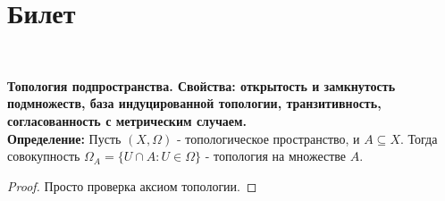 \documentclass[a4paper,100pt]{article}
\theoremstyle{indented}
\begin{document}
\section{Билет} \

\medskip

\textbf{Топология подпространства. Свойства: открытость и замкнутость подмножеств, база индуцированной топологии, транзитивность, согласованность с метрическим случаем.}\\

\textbf{Определение:} Пусть $(X, \Omega)$ - топологическое пространство, и $A \subseteq X$. Тогда совокупность $\Omega_A = \{U\cap A : U \in \Omega \}$ - топология на множестве $A$.

\begin{proof} Просто проверка аксиом топологии.
\end{proof}
\end{document}
